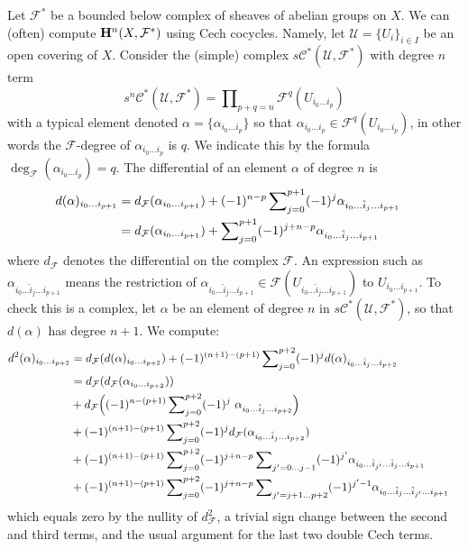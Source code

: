 \medskip\noindent
Let ${\mathcal F}^*$ be a bounded below complex of sheaves of abelian
groups on $X$. We can (often) compute ${\bf H}^n(X, {\mathcal F}^*)$
using Cech cocycles. Namely, let ${\mathcal U} = \{U_i\}_{i\in I}$
be an open covering of $X$. Consider the (simple) complex
$s{\mathcal C}^*({\mathcal U}, {\mathcal F}^*)$
with degree $n$ term
$$
s^n{\mathcal C}^*({\mathcal U}, {\mathcal F}^*) =
\prod\nolimits_{p + q = n} {\mathcal F}^q(U_{i_0\ldots i_p})
$$
with a typical element denoted $\alpha = \{\alpha_{i_0\ldots i_p}\}$
so that $\alpha_{i_0\ldots i_p} \in {\mathcal F}^{q}(U_{i_0\ldots i_p})$,
in other words the ${\mathcal F}$-degree of $\alpha_{i_0\ldots i_p}$ is $q$.
We indicate this by the formula $\deg_{\mathcal F}(\alpha_{i_0\ldots i_p}) = q$.
The differential of an element $\alpha$ of degree $n$ is
\begin{align*}
d(\alpha)_{i_0\ldots i_{p + 1}}
& =
d_{{\mathcal F}}(\alpha_{i_0\ldots i_{p + 1}})
+
(-1)^{n-p}
\sum\nolimits_{j = 0}^{p + 1}
(-1)^j
\alpha_{i_0\ldots \hat i_j \ldots i_{p + 1}}\cr
& =
d_{{\mathcal F}}(\alpha_{i_0\ldots i_{p + 1}})
+
\sum\nolimits_{j = 0}^{p + 1}
(-1)^{j + n-p}
\alpha_{i_0\ldots \hat i_j \ldots i_{p + 1}}
\end{align*}
where $d_{\mathcal F}$ denotes the differential on the complex ${\mathcal F}$.
An expression such as
$\alpha_{i_0\ldots\hat i_j\ldots i_{p + 1}}$ means the restriction
of $\alpha_{i_0\ldots\hat i_j\ldots i_{p + 1}} \in
{\mathcal F}(U_{i_0\ldots\hat i_j\ldots i_{p + 1}})$ to
$U_{i_0\ldots i_{p + 1}}$.
To check this is a complex, let $\alpha$ be an element of
degree $n$ in $s{\mathcal C}^*({\mathcal U}, {\mathcal F}^*)$, so that
$d(\alpha)$ has degree $n + 1$. We compute:
\begin{align*}
d^2(\alpha)_{i_0\ldots i_{p + 2}}
& =
d_{{\mathcal F}}(d(\alpha)_{i_0\ldots i_{p + 2}})
+
(-1)^{(n + 1)-(p + 1)}
\sum\nolimits_{j = 0}^{p + 2}
(-1)^j
d(\alpha)_{i_0\ldots \hat i_j \ldots i_{p + 2}}
\cr
& =
d_{\mathcal F}( d_{{\mathcal F}}(\alpha_{i_0\ldots i_{p + 2}}) )
\cr
& +
d_{\mathcal F}\Big(
(-1)^{n-(p + 1)}
\sum\nolimits_{j = 0}^{p + 2}
(-1)^j
\ \alpha_{i_0\ldots \hat i_j \ldots i_{p + 2}}
\Big)
\cr
& +
(-1)^{(n + 1)-(p + 1)}
\sum\nolimits_{j = 0}^{p + 2}
(-1)^j
d_{{\mathcal F}}(\alpha_{i_0\ldots \hat i_j\ldots i_{p + 2}})
\cr
& +
(-1)^{(n + 1)-(p + 1)}
\sum\nolimits_{j = 0}^{p + 2}
(-1)^{j + n-p}
\sum\nolimits_{j' = 0\ldots j-1}
(-1)^{j'}
\alpha_{i_0\ldots \hat i_{j'}\ldots\hat i_{j} \ldots i_{p + 1}}
\cr
& +
(-1)^{(n + 1)-(p + 1)}
\sum\nolimits_{j = 0}^{p + 2}
(-1)^{j + n-p}
\sum\nolimits_{j' = j + 1\ldots p + 2}
(-1)^{j'-1}
\alpha_{i_0\ldots \hat i_j\ldots\hat i_{j'} \ldots i_{p + 1}}
\end{align*}
which equals zero by the nullity of $d_{\mathcal F}^2$,
a trivial sign change between the second and third terms, and
the usual argument for the last two double Cech terms.

